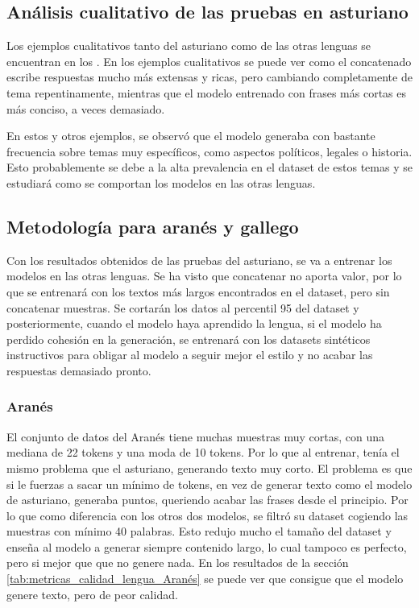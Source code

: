 \subsection{Análisis cualitativo de las pruebas en asturiano}
Los ejemplos cualitativos tanto del asturiano como de las otras lenguas se encuentran en los .
En los ejemplos cualitativos se puede ver como el concatenado escribe respuestas mucho más extensas y ricas, pero cambiando completamente de tema repentinamente, mientras que el modelo entrenado con frases más cortas es más conciso, a veces demasiado.

En estos y otros ejemplos, se observó que el modelo generaba con bastante frecuencia sobre temas muy específicos, como aspectos políticos, legales o historia. Esto probablemente se debe a la alta prevalencia en el dataset de estos temas y se estudiará como se comportan los modelos en las otras lenguas.

 \subsection{Metodología para aranés y gallego}
 Con los resultados obtenidos de las pruebas del asturiano, se va a entrenar los modelos en las otras lenguas. 
 Se ha visto que concatenar no aporta valor, por lo que se entrenará con los textos más largos encontrados en el dataset, pero sin concatenar muestras. Se cortarán los datos al percentil 95 del dataset y posteriormente, cuando el modelo haya aprendido la lengua, si el modelo ha perdido cohesión en la generación, se entrenará con los datasets sintéticos instructivos para obligar al modelo a seguir mejor el estilo y no acabar las respuestas demasiado pronto.

 \subsubsection{Aranés}
 El conjunto de datos del Aranés tiene muchas muestras muy cortas, con una mediana de 22 tokens y una moda de 10 tokens. Por lo que al entrenar, tenía el mismo problema que el asturiano, generando texto muy corto. El problema es que si le fuerzas a sacar un mínimo de tokens, en vez de generar texto como el modelo de asturiano, generaba puntos, queriendo acabar las frases desde el principio. Por lo que como diferencia con los otros dos modelos, se filtró su dataset cogiendo las muestras con mínimo 40 palabras. Esto redujo mucho el tamaño del dataset y enseña al modelo a generar siempre contenido largo, lo cual tampoco es perfecto, pero si mejor que que no genere nada. En los resultados de la sección \ref{tab:metricas_calidad_lengua_Aranés} se puede ver que consigue que el modelo genere texto, pero de peor calidad.

